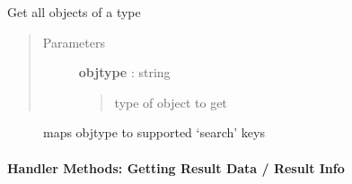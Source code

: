 \documentclass[letterpaper,10pt,english]{sphinxmanual}
\begin{document}
\begin{fulllineitems}
\label{pytan.handler:pytan.handler.Handler.get_all}
Get all objects of a type
\begin{quote}\begin{description}
\item[{Parameters}] \leavevmode
\textbf{objtype} : string
\begin{quote}

type of object to get
\end{quote}

\end{description}\end{quote}



\begin{description}
\item[{{\hyperref[pytan.constants:pytan.constants.GET_OBJ_MAP]{}}}] \leavevmode
maps objtype to supported `search' keys

\end{description}



\end{fulllineitems}



\paragraph{Handler Methods: Getting Result Data / Result Info}
\label{pytan.handler:handler-methods-getting-result-data-result-info}
\end{document}
